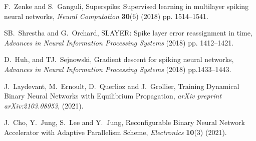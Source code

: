 \documentclass[preprint,twocolumn,5p,12pt]{article}
\begin{document}
\begin{singlespace}
\begin{thebibliography}{10}
F.~Zenke and S.~Ganguli, Superspike: Supervised learning in multilayer spiking neural networks, {\em Neural Computation} {\bf 30}(6)   (2018) pp. 1514--1541.

SB.~Shrestha and G.~Orchard,
 SLAYER: Spike layer error reassignment in time, {\em
Advances in Neural Information Processing Systems}   (2018) pp. 1412--1421.

D.~Huh, and TJ.~Sejnowski, Gradient descent for spiking neural networks, {\em Advances in Neural Information Processing Systems}
    (2018)  pp.1433--1443.

J.~Laydevant, M.~Ernoult, D.~Querlioz and J.~Grollier, Training Dynamical Binary Neural Networks with Equilibrium Propagation, {\em arXiv preprint arXiv:2103.08953}, (2021).

J.~Cho, Y.~Jung, S.~Lee and Y.~Jung, Reconfigurable Binary Neural Network Accelerator with Adaptive Parallelism Scheme, {\em Electronics} {\bf 10}(3)  (2021).


\end{thebibliography}




\end{singlespace}
\end{document}
